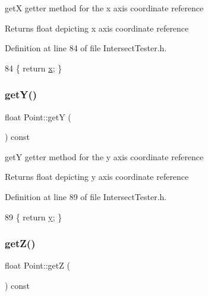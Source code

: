getX getter method for the x axis coordinate reference 

\begin{DoxyReturn}{Returns}
float depicting x axis coordinate reference 
\end{DoxyReturn}


Definition at line 84 of file Intersect\+Tester.\+h.


\begin{DoxyCode}
84 \{ \textcolor{keywordflow}{return} \hyperlink{class_point_a05dfe2dfbde813ad234b514f30e662f1}{x}; \}
\end{DoxyCode}
\mbox{\label{class_point_a2371ffadbe245d12a8f556d0a976521b}} 
\subsubsection{\texorpdfstring{get\+Y()}{getY()}}
{\footnotesize\ttfamily float Point\+::getY (\begin{DoxyParamCaption}{ }\end{DoxyParamCaption}) const\hspace{0.3cm}{\ttfamily [inline]}}



getY getter method for the y axis coordinate reference 

\begin{DoxyReturn}{Returns}
float depicting y axis coordinate reference 
\end{DoxyReturn}


Definition at line 89 of file Intersect\+Tester.\+h.


\begin{DoxyCode}
89 \{ \textcolor{keywordflow}{return} \hyperlink{class_point_a6101960c8d2d4e8ea1d32c9234bbeb8d}{y}; \}
\end{DoxyCode}
\mbox{\label{class_point_a9bb9987e32b7dd8dec81ead5d428446c}} 
\subsubsection{\texorpdfstring{get\+Z()}{getZ()}}
{\footnotesize\ttfamily float Point\+::getZ (\begin{DoxyParamCaption}{ }\end{DoxyParamCaption}) const\hspace{0.3cm}{\ttfamily [inline]}}



